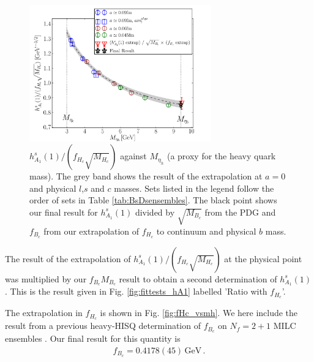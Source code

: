 \begin{figure}[htb!]
  \begin{center}
  \hspace{-10pt}
  \includegraphics[width=0.70\textwidth]{images/BsDsstar/hA1overfHc.pdf}
  \caption{ $h_{A_1}^s(1)/(f_{H_c}\sqrt{M_{H_c}})$ against $M_{\eta_h}$ (a proxy for the heavy quark mass). The grey band shows the result of the extrapolation at $a=0$ and physical $l$,$s$ and $c$ masses. Sets listed in the legend follow the order of sets in Table \ref{tab:BsDsensembles}. The black point shows our final result for $h_{A_1}^s(1)$ divided by $\sqrt{M_{B_c}}$ from the PDG \cite{PhysRevD.98.030001} and $f_{B_c}$ from our extrapolation of $f_{H_c}$ to continuum and physical $b$ mass.
    \label{fig:fHc}}
  \end{center}
\end{figure}


The result of the extrapolation of $h_{A_1}^s(1)/(f_{H_c}\sqrt{M_{H_c}})$ at the physical point was multiplied by our $f_{B_c}M_{B_c}$ result to obtain a second determination of $h_{A_1}^s(1)$. This is the result given in Fig. \ref{fig:fittests_hA1} labelled 'Ratio with $f_{H_c}$'.

The extrapolation in $f_{H_c}$ is shown in Fig. \ref{fig:fHc_vsmh}. We here include the result from a previous heavy-HISQ determination of $f_{B_c}$ on $N_f=2+1$ MILC ensembles \cite{McNeile:2012qf}. Our final result for this quantity is
\begin{align}
  f_{B_c} = 0.4178(45)\,\text{GeV}\,.
\end{align}

